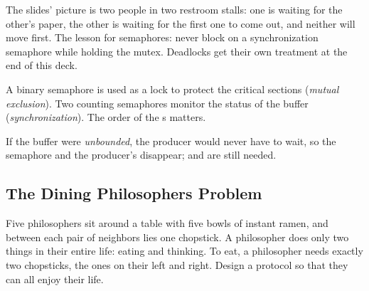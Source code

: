 The slides' picture is two people in two restroom stalls: one is waiting for the other's paper, the other is waiting for the first one to come out, and neither will move first. The lesson for semaphores: never block on a synchronization semaphore while holding the mutex. Deadlocks get their own treatment at the end of this deck.

\begin{keypoint}
  A binary semaphore is used as a lock to protect the critical sections (\emph{mutual exclusion}). Two counting semaphores monitor the status of the buffer (\emph{synchronization}). The order of the s matters.
\end{keypoint}

If the buffer were \emph{unbounded}, the producer would never have to wait, so the  semaphore and the producer's  disappear;  and  are still needed.

\subsection{The Dining Philosophers Problem}

\begin{definition}
  Five philosophers sit around a table with five bowls of instant ramen, and between each pair of neighbors lies one chopstick. A philosopher does only two things in their entire life: eating and thinking. To eat, a philosopher needs exactly two chopsticks, the ones on their left and right. Design a protocol so that they can all enjoy their life.
\end{definition}


